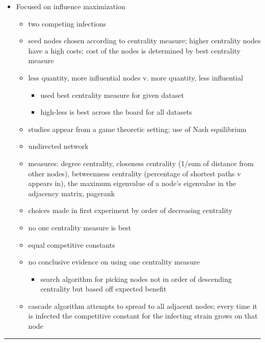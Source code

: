 \documentclass[11pt]{article}
\begin{document}
\begin{itemize}
\item Focused on influence maximization
  \begin{itemize}
     \item two competing infections
     \item seed nodes chosen according to centrality measure; 
           higher centrality nodes have a high costs; 
           cost of the nodes is determined by best centrality measure
    \item less quantity, more influential nodes v. more quantity, less influential
        \begin{itemize}
	   \item used best centrality measure for given dataset
	   \item high-less is best across the board for all datasets
        \end{itemize}
	\item studies appear from a game theoretic setting; use of Nash equilibrium
	\item undirected network
	\item measures: degree centrality, closeness centrality
	(1/sum of distance from other nodes), betweenness centrality
	(percentage of shortest paths v appears in), the maximum
	eigenvalue of a node’s eigenvalue in the adjacency matrix,
	pagerank
	\item choices made in first experiment by order of decreasing centrality
	\item no one centrality measure is best
	\item equal competitive constants
	\item no conclusive evidence on using one centrality measure
            \begin{itemize}
		\item search algorithm for picking nodes not in
		order of descending centrality but based off expected
		benefit
            \end{itemize}
	\item cascade algorithm attempts to spread to all adjacent
	nodes; every time it is infected the competitive constant
	for the infecting strain grows on that node
   \end{itemize}
\end{itemize}

\smallskip

\noindent
\rule{\textwidth}{0.01in}

\clearpage
\end{document}
